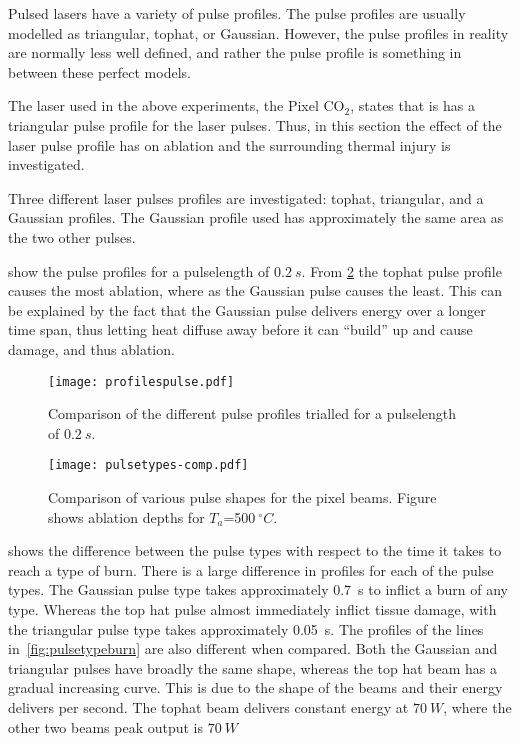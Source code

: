 Pulsed lasers have a variety of pulse profiles.
The pulse profiles are usually modelled as triangular, tophat, or Gaussian.
However, the pulse profiles in reality are normally less well defined, and rather the pulse profile is something in between these perfect models.

The laser used in the above experiments, the Pixel CO$_2$, states that is has a triangular pulse profile for the laser pulses.
Thus, in this section the effect of the laser pulse profile has on ablation and the surrounding thermal injury is investigated.

Three different laser pulses profiles are investigated: tophat, triangular, and a Gaussian profiles.
The Gaussian profile used has approximately the same area as the two other pulses.

 show the pulse profiles for a pulselength of $0.2~s$.
From \cref{fig:comparepulsetypes} the tophat pulse profile causes the most ablation, where as the Gaussian pulse causes the least.
This can be explained by the fact that the Gaussian pulse delivers energy over a longer time span, thus letting heat diffuse away before it can ``build'' up and cause damage, and thus ablation.

\begin{figure}[!htbp]
	\centering
	\texttt{[image: profilespulse.pdf]}
	\caption{Comparison of the different pulse profiles trialled for a pulselength of $0.2~s$.}
	\label{fig:pulseprofiles}
\end{figure}

\begin{figure}[!htbp]
	\centering
	\texttt{[image: pulsetypes-comp.pdf]}
	\caption{Comparison of various pulse shapes for the pixel beams. Figure shows ablation depths for $T_a$=500$~^{\circ}C$.}
	\label{fig:comparepulsetypes}
\end{figure}

 shows the difference between the pulse types with respect to the time it takes to reach a type of burn.
There is a large difference in profiles for each of the pulse types.
The Gaussian pulse type takes approximately 0.7~s to inflict a burn of any type.
Whereas the top hat pulse almost immediately inflict tissue damage, with the triangular pulse type takes approximately 0.05~s.
The profiles of the lines in~\cref{fig:pulsetypeburn} are also different when compared.
Both the Gaussian and triangular pulses have broadly the same shape, whereas the top hat beam has a gradual increasing curve.
This is due to the shape of the beams and their energy delivers per second.
The tophat beam delivers constant energy at $70~W$, where the other two beams peak output is $70~W$

